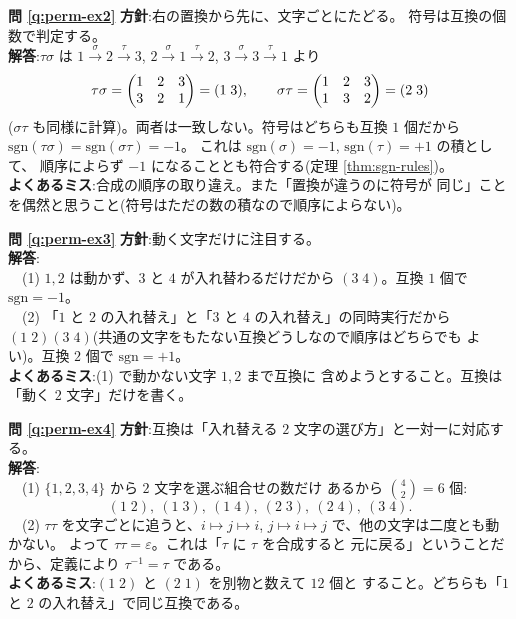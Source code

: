 \bigskip
\noindent\textbf{問 \ref{q:perm-ex2}}\quad
\textbf{方針}:右の置換から先に、文字ごとにたどる。
符号は互換の個数で判定する。\\
\textbf{解答}:$\tau\sigma$ は
$1 \xrightarrow{\sigma} 2 \xrightarrow{\tau} 3$,
$2 \xrightarrow{\sigma} 1 \xrightarrow{\tau} 2$,
$3 \xrightarrow{\sigma} 3 \xrightarrow{\tau} 1$ より
\[
\tau\sigma = \begin{pmatrix}1 & 2 & 3 \\ 3 & 2 & 1\end{pmatrix} = (1\;3), \qquad
\sigma\tau = \begin{pmatrix}1 & 2 & 3 \\ 1 & 3 & 2\end{pmatrix} = (2\;3)
\]
($\sigma\tau$ も同様に計算)。両者は一致しない。符号はどちらも互換
$1$ 個だから $\mathrm{sgn}(\tau\sigma) = \mathrm{sgn}(\sigma\tau) = -1$。
これは $\mathrm{sgn}(\sigma) = -1$, $\mathrm{sgn}(\tau) = +1$ の積として、
順序によらず $-1$ になることとも符合する(定理 \ref{thm:sgn-rules})。\\
\textbf{よくあるミス}:合成の順序の取り違え。また「置換が違うのに符号が
同じ」ことを偶然と思うこと(符号はただの数の積なので順序によらない)。

\bigskip
\noindent\textbf{問 \ref{q:perm-ex3}}\quad
\textbf{方針}:動く文字だけに注目する。\\
\textbf{解答}:\\
　(1) $1, 2$ は動かず、$3$ と $4$ が入れ替わるだけだから
$(3\;4)$。互換 $1$ 個で $\mathrm{sgn} = -1$。\\
　(2) 「$1$ と $2$ の入れ替え」と「$3$ と $4$ の入れ替え」の同時実行だから
$(1\;2)(3\;4)$(共通の文字をもたない互換どうしなので順序はどちらでも
よい)。互換 $2$ 個で $\mathrm{sgn} = +1$。\\
\textbf{よくあるミス}:(1) で動かない文字 $1, 2$ まで互換に
含めようとすること。互換は「動く $2$ 文字」だけを書く。

\bigskip
\noindent\textbf{問 \ref{q:perm-ex4}}\quad
\textbf{方針}:互換は「入れ替える $2$ 文字の選び方」と一対一に対応する。\\
\textbf{解答}:\\
　(1) $\{1, 2, 3, 4\}$ から $2$ 文字を選ぶ組合せの数だけ
あるから $\binom{4}{2} = 6$ 個:
\[
(1\;2),\ (1\;3),\ (1\;4),\ (2\;3),\ (2\;4),\ (3\;4).
\]
　(2) $\tau\tau$ を文字ごとに追うと、$i \mapsto j \mapsto i$,
$j \mapsto i \mapsto j$ で、他の文字は二度とも動かない。
よって $\tau\tau = \varepsilon$。これは「$\tau$ に $\tau$ を合成すると
元に戻る」ということだから、定義により $\tau^{-1} = \tau$ である。\\
\textbf{よくあるミス}:$(1\;2)$ と $(2\;1)$ を別物と数えて $12$ 個と
すること。どちらも「$1$ と $2$ の入れ替え」で同じ互換である。

